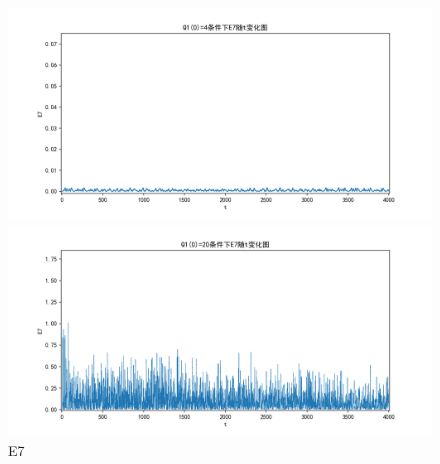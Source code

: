 \documentclass[10pt, a4paper]{article}
\begin{document}
    \begin{figure}[H]
        \begin{minipage}[t]{0.49\textwidth}
            \centering
            \includegraphics[width=\textwidth]{./q5_pics/cmp/E7.png}
        \end{minipage}
        \begin{minipage}[t]{0.49\textwidth}
            \centering
            \includegraphics[width=\textwidth]{./q5_pics/exp/E7.png}
        \end{minipage}
        \caption{E7}\label{fig:E7 in q5}
    \end{figure}
\end{document}
